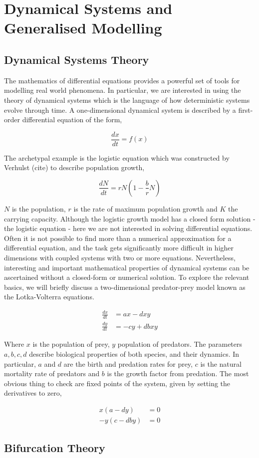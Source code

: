 \documentclass[11pt, a4paper]{book}
\begin{document}
\chapter{Dynamical Systems and Generalised Modelling}
\label{cha:methodology}

\section{Dynamical Systems Theory}
\label{sec:dynamicalIntro}
The mathematics of differential equations provides a powerful set of tools for modelling real world phenomena. In particular, we are interested in using the theory of dynamical systems which is the language of how deterministic systems evolve through time. A one-dimensional dynamical system is described by a first-order differential equation of the form,

\[\frac{dx}{dt} = f(x) \]

The archetypal example is the logistic equation which was constructed by Verhulst (cite) to describe population growth,

\[\frac{dN}{dt} = rN\left(1-\frac{b}{r}N\right) \]

$N$ is the population, $r$ is the rate of maximum population growth and $K$ the carrying capacity. Although the logistic growth model has a closed form solution - the logistic equation - here we are not interested in solving differential equations. Often it is not possible to find more than a numerical approximation for a differential equation, and the task gets significantly more difficult in higher dimensions with coupled systems with two or more equations. Nevertheless, interesting and important mathematical properties of dynamical systems can be ascertained without a closed-form or numerical solution. To explore the relevant basics, we will briefly discuss a two-dimensional predator-prey model known as the Lotka-Volterra equations.


\begin{eqnarray}
\frac{dx}{dt} &= ax-dxy \\
\frac{dy}{dt} &= -cy +dbxy
\end{eqnarray}

Where $x$ is the population of prey, $y$ population of predators. The parameters $a,b,c,d$ describe biological properties of both species, and their dynamics. In particular, $a$ and $d$ are the birth and predation rates for prey, $c$ is the natural mortality rate of predators and $b$ is the growth factor from predation. The most obvious thing to check are fixed points of the system, given by setting the derivatives to zero,

\begin{eqnarray}
x(a-dy) &= 0\\
 -y(c -dby) &= 0
\end{eqnarray}

\section{Bifurcation Theory}
\label{sec:bifurcationTheory}



\end{document}
